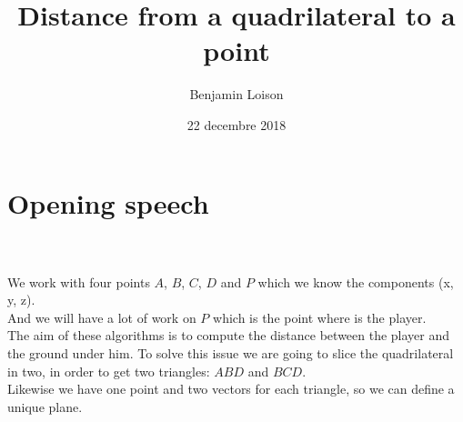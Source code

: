 \documentclass{article}
\begin{document}
	\title{Distance from a quadrilateral to a point}
	\author{Benjamin Loison}
	\date{22 decembre 2018}
	\maketitle

	\tableofcontents
	\clearpage

	\section{Opening speech}

		\\\\

		
		We work with four points $A$, $B$, $C$, $D$ and $P$ which we know the components (x, y, z).\\
		And we will have a lot of work on $P$ which is the point where is the player.\\
		The aim of these algorithms is to compute the distance between the player and the ground under him.
		To solve this issue we are going to slice the quadrilateral in two, in order to get two triangles: $ABD$ and $BCD$.\\
		Likewise we have one point and two vectors for each triangle, so we can define a unique plane.
\end{document}
